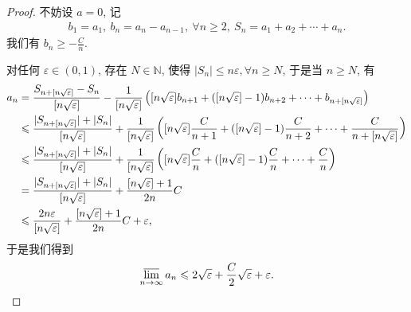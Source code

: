 \documentclass[../../main.tex]{subfiles}%
\begin{document}
\begin{proof}
不妨设 $a = 0$, 记
\begin{align*}
b_1 = a_1,\ b_n = a_n - a_{n-1},\ \forall n \geqslant 2,\ S_n = a_1 + a_2 + \cdots + a_n.
\end{align*}
我们有 $b_n \geqslant -\frac{C}{n}$.

对任何 $\varepsilon \in (0,1)$, 存在 $N \in \mathbb{N}$, 使得 $|S_n| \leqslant n \varepsilon, \forall n \geqslant N$, 于是当 $n \geqslant N$, 有
\begin{align}
a_n &= \frac{S_{n + [n\sqrt{\varepsilon}]} - S_n}{[n\sqrt{\varepsilon}]} - \frac{1}{[n\sqrt{\varepsilon}]} \left( [n\sqrt{\varepsilon}] b_{n+1} + ([n\sqrt{\varepsilon}] - 1) b_{n+2} + \cdots + b_{n + [n\sqrt{\varepsilon}]} \right) \notag \\
&\leqslant \frac{|S_{n + [n\sqrt{\varepsilon}]}| + |S_n|}{[n\sqrt{\varepsilon}]} + \frac{1}{[n\sqrt{\varepsilon}]} \left( [n\sqrt{\varepsilon}] \frac{C}{n + 1} + ([n\sqrt{\varepsilon}] - 1) \frac{C}{n + 2} + \cdots + \frac{C}{n + [n\sqrt{\varepsilon}]} \right) \notag \\
&\leqslant \frac{|S_{n + [n\sqrt{\varepsilon}]}| + |S_n|}{[n\sqrt{\varepsilon}]} + \frac{1}{[n\sqrt{\varepsilon}]} \left( [n\sqrt{\varepsilon}] \frac{C}{n} + ([n\sqrt{\varepsilon}] - 1) \frac{C}{n} + \cdots + \frac{C}{n} \right) \notag \\
&= \frac{|S_{n + [n\sqrt{\varepsilon}]}| + |S_n|}{[n\sqrt{\varepsilon}]} + \frac{[n\sqrt{\varepsilon}] + 1}{2n} C \notag \\
&\leqslant \frac{2n \varepsilon}{[n\sqrt{\varepsilon}]} + \frac{[n\sqrt{\varepsilon}] + 1}{2n} C + \varepsilon, \label{eq:9.130}
\end{align}
于是我们得到
\begin{align*}
\varlimsup_{n \to \infty} a_n \leqslant 2\sqrt{\varepsilon} + \frac{C}{2}\sqrt{\varepsilon} + \varepsilon.
\end{align*}


\end{proof}
\end{document}
